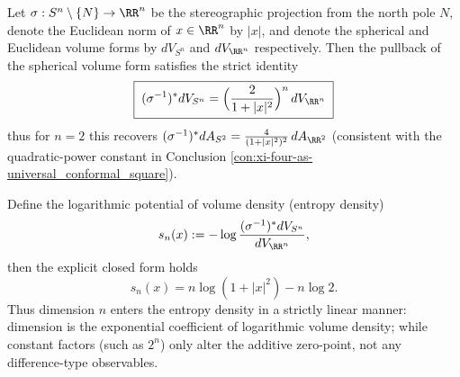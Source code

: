 
\begin{proposition}\label{prop:xi-stereographic-jacobian-entropy-density}
Let \(\sigma:S^{n}\setminus\{N\}\to\RR^{n}\) be the stereographic projection from the north pole \(N\), denote the Euclidean norm of \(x\in\RR^{n}\) by \(|x|\), and denote the spherical and Euclidean volume forms by \(dV_{S^{n}}\) and \(dV_{\RR^{n}}\) respectively.
Then the pullback of the spherical volume form satisfies the strict identity
\[
\boxed{\;
(\sigma^{-1})^\ast dV_{S^{n}}
=\Bigl(\frac{2}{1+|x|^{2}}\Bigr)^{n}\,dV_{\RR^{n}}\;}
\]
thus for \(n=2\) this recovers
\(
(\sigma^{-1})^\ast dA_{S^{2}}=\frac{4}{(1+|x|^{2})^{2}}\,dA_{\RR^{2}}
\)
(consistent with the quadratic-power constant in Conclusion \ref{con:xi-four-as-universal_conformal_square}).
\par
Define the logarithmic potential of volume density (entropy density)
\[
s_{n}(x):=-\log\frac{(\sigma^{-1})^\ast dV_{S^{n}}}{dV_{\RR^{n}}},
\]
then the explicit closed form holds
\[
\boxed{\;
s_{n}(x)=n\log(1+|x|^{2})-n\log 2.\;}
\]
Thus dimension \(n\) enters the entropy density in a strictly linear manner: dimension is the exponential coefficient of logarithmic volume density; while constant factors (such as \(2^{n}\)) only alter the additive zero-point, not any difference-type observables.
\end{proposition}

